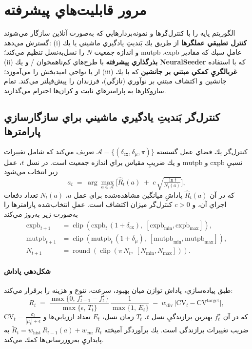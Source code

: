\section{مرور قابليت‌هاي پيشرفته}

 الگوريتم پايه  را با كنترل‌گرها و نمونه‌بردارهايي كه به‌صورت آنلاين سازگار مي‌شوند گسترش مي‌دهد: 
(i) \textbf{كنترل تطبيقي عملگرها} از طريق يك بَنديتِ يادگيري ماشيني  يا يك عاملِ  سبك كه مقادير \(\text{cxpb}\)، \(\text{mutpb}\) و اندازه جمعيت \(N\) را نسل‌به‌نسل تنظيم مي‌كند؛ 
(ii) \textbf{بذرگذاري پيشرفته} با طرح‌هاي كم‌ناهمخوان / و يك \textbf{NeuralSeeder} كه با استفاده از  يا  نواحي اميدبخش را مي‌آموزد؛ 
(iii) \textbf{غربالگريِ كمكي مبتني بر جانشين} كه با يك جانشين  و اكتشاف مبتني بر نوآوري (تازگي)، فرزندان را پيش‌فيلتر مي‌كند. 
تمام سازوكارها به پارامترهاي ثابت و كران‌ها احترام مي‌گذارند.

\subsection{كنترل‌گر بَنديتِ يادگيري ماشيني براي سازگارسازي پارامترها}

كنترل‌گر يك فضاي عمل گسسته \(\mathcal{A}=\{(\delta_{\text{cx}},\delta_{\mu},\pi)\}\) تعريف مي‌كند كه شامل تغييرات نسبيِ \(\text{cxpb}\) و \(\text{mutpb}\) و يك ضريبِ مقياس براي اندازه جمعيت است. در نسل \(t\)، عمل زير انتخاب مي‌شود
\begin{equation}
    a_t\;=\;\arg\max_{a\in\mathcal{A}}\Big[ \hat{R}_t(a)\; +\; c\,\sqrt{\tfrac{\ln t}{N_t(a)}} \Big], \label{Eq.ucb}
\end{equation}
كه در آن \(\hat{R}_t(a)\) پاداشِ ميانگين مشاهده‌شده براي عمل \(a\)، \(N_t(a)\) تعداد دفعات اجراي آن، و \(c>0\) كنترل‌گر ميزان اكتشاف است. عملِ انتخاب‌شده پارامترها را به‌صورت زير به‌روز مي‌كند
\begin{align}
    \text{cxpb}_{t+1}&=\operatorname{clip}(\text{cxpb}_t\,(1+\delta_{\text{cx}}),\;[\text{cxpb}_{\min},\text{cxpb}_{\max}]),\\
    \text{mutpb}_{t+1}&=\operatorname{clip}(\text{mutpb}_t\,(1+\delta_{\mu}),\;[\text{mutpb}_{\min},\text{mutpb}_{\max}]),\\
    N_{t+1}&=\operatorname{round}(\operatorname{clip}(\pi\,N_t,\;[N_{\min},N_{\max}])).
\end{align}

\paragraph{شكل‌دهي پاداش}
طبق پياده‌سازي، پاداش توازن ميان بهبود، سرعت، تنوع و هزينه را برقرار مي‌كند:
\begin{equation}\label{Eq.bandit_reward}
    R_t\;=\;\frac{\max\{0,\,f^{\star}_{t-1}-f^{\star}_{t}\}}{\max\{\epsilon,\,T_t\}}\,\frac{1}{\max\{1,\,E_t\}}\; -\; w_{\text{div}}\,\big|\mathrm{CV}_t-\mathrm{CV}^{\text{target}}\big|,
\end{equation}
كه در آن \(f^{\star}_t\) بهترين برازندگيِ نسل \(t\)، \(T_t\) زمان نسل، \(E_t\) تعداد ارزيابي‌ها و \(\mathrm{CV}_t=\tfrac{\sigma_t}{|\mu_t|+\epsilon}\) ضريب تغييرات برازندگي است. يك برآوردگر آميخته \(\tilde R_t= w_{\text{hist}}\,\hat{R}_{t-1}(a)+w_{\text{cur}}\,R_t\) به پايداريِ به‌روزرسانی‌ها كمك مي‌كند.

